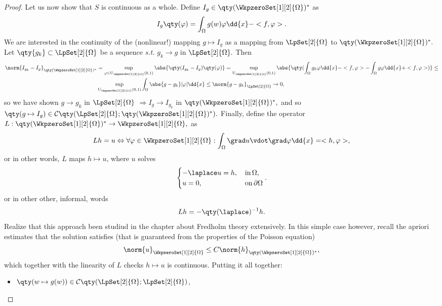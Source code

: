 \begin{example}
\begin{proof}
		Let us now show that $S$ is continuous as a whole. Define $I_g \in \qty(\WkpzeroSet[1][2]{\Omega})^{*}$ as
		\[
			I_g\qty(\varphi) = \int_{\Omega}g(w) \varphi\dd{x} - <f, \varphi>.
		\]
		We are interested in the continuity of the (nonlinear!) mapping $g \mapsto I_g$ as a mapping from $\LpSet[2]{\Omega}$ to $\qty(\WkpzeroSet[1][2]{\Omega})^{*}.$ Let $\qty{g_k} \subset \LpSet[2]{\Omega}$ be a sequence \textit{s.t.} $g_k \to g$ in  $\LpSet[2]{\Omega}.$ Then
		\begin{align*}
			\norm{I_{g_k}- I_g}_{\qty(\WkpzeroSet[1][2]{\Omega})^{*}} &= \sup_{\varphi \in \text{U}_{\WkpzeroSet[1][2]{\Omega}}(0,1)}\abs{\qty(I_{g_k}-I_g)\qty(\varphi)} = \sup_{\text{U}_{\WkpzeroSet[1][2]{\Omega}}(0,1)}\abs{\qty(\int_{\Omega}g_k \varphi\dd{x} - <f,\varphi> - \int_{\Omega}g \varphi\dd{x}+<f,\varphi>)} \leq \\
										  &\sup_{\text{U}_{\WkpzeroSet[1][2]{\Omega}}(0,1)}\int_{\Omega}\abs{g - g_k}|\varphi|\dd{x} \leq \norm{g-g_k}_{\LpSet[2]{\Omega}} \to 0,
		\end{align*}
		so we have shown $g \to g_k$ in $\LpSet[2]{\Omega}$ $\Rightarrow I_g \to I_{g_k}$ in $\qty(\WkpzeroSet[1][2]{\Omega})^{*},$ and so $\qty(g \mapsto I_g) \in \mathcal{C}\qty(\LpSet[2]{\Omega}; \qty(\WkpzeroSet[1][2]{\Omega})^{*}).$ Finally, define the operator $L: \qty(\WkpzeroSet[1][2]{\Omega})^{*} \to \WkpzeroSet[1][2]{\Omega},$ as
		\[
			Lh = u \Leftrightarrow \forall \varphi \in \WkpzeroSet[1][2]{\Omega}: \int_{\Omega}\grad u \vdot \grad \varphi \dd{x} = <h, \varphi>,
		\]
		or in other words, $L$ maps $h \mapsto u$, where $u$ solves
		\[
			\begin{cases}
				-\laplace u = h, & \, \text{in} \, \Omega, \\
				u = 0, & \, \text{on} \, \partial \Omega
			\end{cases}.
		\]
		or in other other, informal, words
		\[
			Lh = - \qty(\laplace)^{-1}h.
		\]
		Realize that this approach been studiud in the chapter about Fredholm theory extensively. In this simple case however, recall the apriori estimates that the solution satisfies (that is guaranteed from the properties of the Poisson equation)
		\[
			\norm{u}_{\WkpzeroSet[1][2]{\Omega}}\leq C \norm{h}_{\qty(\WkpzeroSet[1][2]{\Omega})^{*}},
		\]
		which together with the linearity of $L$ checks $h \mapsto u$ is continuous. Putting it all together:
		\begin{itemize}
			\item $\qty(w \mapsto g(w)) \in \mathcal{C}\qty(\LpSet[2]{\Omega};\LpSet[2]{\Omega})$,

\end{itemize}
\end{proof}
\end{example}
